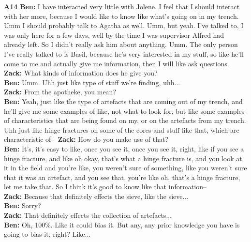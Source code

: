 \documentclass{article}
\begin{document}
\noindent\textbf{A14}\label{sec-A14}\newline
\textbf{Ben:} I have interacted very little with Jolene. I feel that I
should interact with her more, because I would like to know like what's
going on in my trench. Umm I should probably talk to Agatha as well.
Umm, but yeah. I've talked to, I was only here for a few days, well by
the time I was supervisor Alfred had already left. So I didn't really
ask him about anything. Umm. The only person I've really talked to is
Basil, because he's very interested in my stuff, so like he'll come to
me and actually give me information, then I will like ask questions.\\
\textbf{Zack:} What kinds of information does he give you?\\
\textbf{Ben:} Umm. Uhh just like type of stuff we're finding, uhh...\\
\textbf{Zack:} From the apotheke, you mean?\\
\textbf{Ben:} Yeah, just like the type of artefacts that are coming out
of my trench, and he'll give me some examples of like, not what to look
for, but like some examples of characteristics that are being found on
my, or on the artefacts from my trench. Uhh just like hinge fractures on
some of the cores and stuff like that, which are characteristic
of--~\textbf{Zack:} How do you make use of that?\\
\textbf{Ben:} It's, it's easy to like, once you see it, once you see it,
right, like if you see a hinge fracture, and like oh okay, that's what a
hinge fracture is, and you look at it in the field and you're like, you
weren't sure of something, like you weren't sure that it was an
artefact, and you see that, you're like oh, that's a hinge fracture, let
me take that. So I think it's good to know like that information--\\
\textbf{Zack:} Because that definitely effects the sieve, like the
sieve...\\
\textbf{Ben:} Sorry?\\
\textbf{Zack:} That definitely effects the collection of artefacts...\\
\textbf{Ben:} Oh, 100\%. Like it could bias it. But any, any prior
knowledge you have is going to bias it, right? Like...\newline
\end{document}
